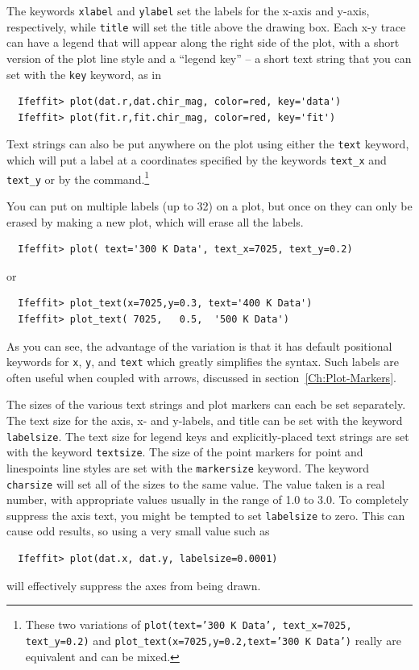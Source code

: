 {The keywords \texttt{xlabel} and \texttt{ylabel} set the labels for the
x-axis and y-axis, respectively, while \texttt{title} will set the title
above the drawing box.  Each x-y trace can have a legend that will appear
along the right side of the plot, with a short version of the plot line
style and a ``legend key'' -- a short text string that you can set with
{} the {\tt{key}} keyword, as in
\begin{verbatim}
  Ifeffit> plot(dat.r,dat.chir_mag, color=red, key='data')
  Ifeffit> plot(fit.r,fit.chir_mag, color=red, key='fit')
\end{verbatim}
\noindent

Text strings can also be put anywhere on the plot using either the
\texttt{text} keyword, which will put a label at a coordinates specified by
the keywords \texttt{text\_x} and \texttt{text\_y} or by the
{} command.\footnote{These two variations of
  {\texttt{plot(text='300 K Data', text\_x=7025, text\_y=0.2)}} and
  {\texttt{plot\_text(x=7025,y=0.2,text='300 K Data')}} really are
  equivalent and can be mixed.}}

You can put on multiple labels (up to 32) on a plot, but once on they can
only be erased by making a new plot, which will erase all the labels.
\begin{verbatim}
  Ifeffit> plot( text='300 K Data', text_x=7025, text_y=0.2)
\end{verbatim}
\noindent
or
\begin{verbatim}
  Ifeffit> plot_text(x=7025,y=0.3, text='400 K Data')
  Ifeffit> plot_text( 7025,   0.5,  '500 K Data')
\end{verbatim}
\noindent
As you can see, the advantage of the {} variation is that
it has default positional keywords for {\tt{x}}, {\tt{y}}, and {\tt{text}}
which greatly simplifies the syntax. Such labels are often useful when
coupled with arrows, discussed in section~\ref{Ch:Plot-Markers}.

{}
The sizes of the various text strings and plot markers can each be set
separately.  The text size for the axis, x- and y-labels, and title can be
set with the keyword {\tt{labelsize}}.  The text size for legend keys and
explicitly-placed text strings are set with the keyword {\tt{textsize}}.
The size of the point markers for point and linespoints line styles are set
with the {\tt{markersize}} keyword.  The keyword {\tt{charsize}} will set
all of the sizes to the same value.  The value taken is a real number, with
appropriate values usually in the range of 1.0 to 3.0.  To completely
suppress the axis text, you might be tempted to set {\tt{labelsize}} to
zero.  This can cause odd results, so using a very small value such as
\begin{verbatim}
  Ifeffit> plot(dat.x, dat.y, labelsize=0.0001)
\end{verbatim}
\noindent
will effectively suppress the axes from being drawn.

